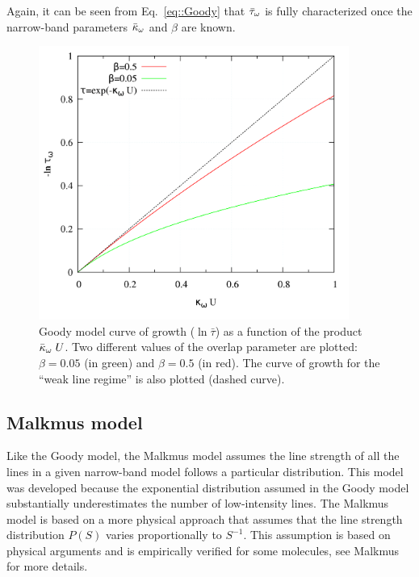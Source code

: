 Again, it can be seen from Eq.~\ref{eq::Goody} that $\bar{\tau}_{\omega}$ is fully characterized once the narrow-band parameters $\bar{\kappa}_{\omega}$ and $\beta$ are known.

\begin{figure}
\begin{center}
 \includegraphics[width=4.0in]{Figures/Goody_curve_of_growth.png}
\end{center}
 \caption{Goody model curve of growth ($\ln \bar{\tau}$) as a function of the product $\bar{\kappa}_{\omega}\;U$. Two different values of the overlap parameter are plotted: $\beta = 0.05$ (in green) and $\beta = 0.5$ (in red). The curve of growth for the ``weak line regime'' is also plotted (dashed curve).\label{fig::Goody_curve_growth}}
\end{figure}

\subsection{Malkmus model}\label{sec:malkmus_model}

Like the Goody model, the Malkmus model assumes the line strength of all the lines in a given narrow-band model follows a particular distribution. This model was developed because the exponential distribution assumed in the Goody model substantially underestimates the number of low-intensity lines. The Malkmus model is based on a more physical approach that assumes that the line strength distribution $P(S)$ varies proportionally to $S^{-1}$. This assumption is based on physical arguments and is empirically verified for some molecules, see Malkmus~\cite{Malkmus1967} for more details.

